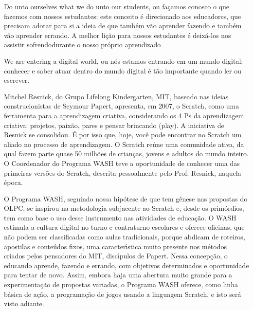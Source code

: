 \documentclass[
12pt,		%
openright,	%
twoside,  %
a4paper,			%
chapter=TITLE,		%
english,			%
french,				%
spanish,			%
brazil				%
]{USPSC-classe/USPSC}
\begin{document}
\begin{alineas}
\item Do unto ourselves what we do unto our students, ou \textquotedbl fa\c{c}amos conosco o que fazemos com nossos estudantes\textquotedbl : este conceito \'e direcionado aos educadores, que precisam adotar para si a ideia de que tamb\'em v\~ao aprender fazendo e tamb\'em v\~ao aprender errando. A melhor li\c{c}\~ao para nossos estudantes \'e deix\'a-los nos assistir \textquotedbl sofrendo\textquotedbl  durante o nosso pr\'oprio aprendizado
\item We are entering a digital world, ou \textquotedbl n\'os estamos entrando em um mundo digital\textquotedbl : conhecer e saber atuar dentro do mundo digital \'e t\~ao importante quando ler ou escrever.
\end{alineas}

Mitchel Resnick, do Grupo Lifelong Kindergarten, MIT, baseado nas ideias construcionistas de Seymour Papert, apresenta, em 2007, o Scratch, como uma ferramenta para a aprendizagem criativa, considerando os 4 Ps da aprendizagem criativa: projetos, paix\~ao, pares e pensar brincando (play). A iniciativa de Resnick se consolidou. \'E por isso que, hoje, voc\^e pode encontrar no Scratch um aliado no processo de aprendizagem. O Scratch re\'une uma comunidade ativa, da qual fazem parte quase 50 milh\~oes de crian\c{c}as, jovens e adultos do mundo inteiro. O Coordenador do Programa WASH teve a oportunidade de conhecer uma das primeiras vers\~oes do Scratch, descrita pessoalmente pelo Prof. Resnick, naquela \'epoca.









O Programa WASH, seguindo nossa hip\'otese de que tem g\^enese nas propostas do OLPC, se inspirou na metodologia subjacente ao Scratch e, desde os prim\'ordios, tem como base o uso desse instrumento nas atividades de educa\c{c}\~ao. O WASH estimula a cultura digital no turno e contraturno escolares e oferece oficinas, que n\~ao podem ser classificadas como aulas tradicionais, porque abdicam de roteiros, apostilas e conte\'udos fixos, uma caracter\'{\i}stica muito presente nos m\'etodos criados pelos pensadores do MIT, disc\'{\i}pulos de Papert. Nessa concep\c{c}\~ao, o educando aprende, fazendo e errando, com objetivos determinados e oportunidade para tentar de novo. Assim, embora haja uma abertura muito grande para a experimenta\c{c}\~ao de propostas variadas, o Programa WASH oferece, como linha b\'asica de a\c{c}\~ao, a programa\c{c}\~ao de jogos usando a linguagem Scratch, e isto ser\'a visto adiante.
\end{document}
